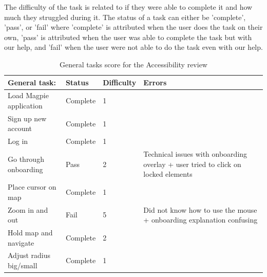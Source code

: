 \noindent The difficulty of the task is related to if they were able to complete it and how much they struggled during it. The status of a task can either be 'complete', 'pass', or 'fail' where 'complete' is attributed when the user does the task on their own, 'pass' is attributed when the user was able to complete the task but with our help, and 'fail' when the user were not able to do the task even with our help. \\
\begin{table}[h!]
    \centering
    \caption{General tasks score for the Accessibility review}
    \begin{tabular}{|p{}|p{}|p{}|p{}|}
        \hline
        \textbf{General task:}           & \textbf{Status} & \textbf{Difficulty} & \textbf{Errors}                                                                   \\
        \hline
        Load Magpie application          & Complete        & 1                   &                                                                                   \\
        \hline
        Sign up new account              & Complete        & 1                   &                                                                                   \\
        \hline
        Log in                           & Complete        & 1                   &                                                                                   \\
        \hline
        Go through onboarding            & Pass            & 2                   & Technical issues with onboarding overlay + user tried to click on locked elements \\
        \hline
        Place cursor on map              & Complete        & 1                   &                                                                                   \\
        \hline
        Zoom in and out                  & Fail            & 5                   & Did not know how to use the mouse + onboarding explanation confusing              \\
        \hline
        Hold map and navigate            & Complete        & 2                   &                                                                                   \\
        \hline
        Adjust radius big/small          & Complete        & 1                   &                                                                                   \\

\end{tabular}
\end{table}
